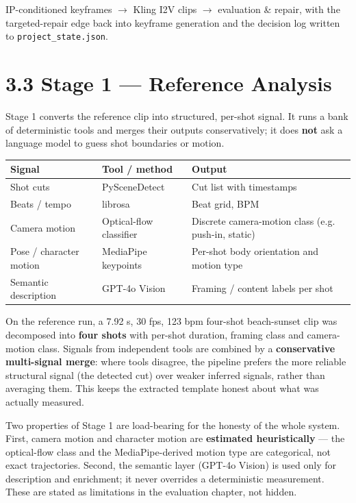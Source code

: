 \documentclass[10pt,twocolumn,letterpaper]{article}
\begin{document}
IP-conditioned keyframes $\rightarrow$ Kling I2V clips $\rightarrow$ evaluation \& repair, with the targeted-repair edge back into keyframe generation and the decision log written to \texttt{project\_state.json}.

\section*{3.3 Stage 1 --- Reference Analysis}

Stage 1 converts the reference clip into structured, per-shot signal. It runs a bank of deterministic tools and merges their outputs conservatively; it does \textbf{not} ask a language model to guess shot boundaries or motion.

\begin{table}[t]
\centering
\footnotesize
\begin{tabularx}{\textwidth}{>{\RaggedRight\arraybackslash}X>{\RaggedRight\arraybackslash}X>{\RaggedRight\arraybackslash}X}
\toprule
Signal & Tool / method & Output \\
\midrule
Shot cuts & PySceneDetect & Cut list with timestamps \\
Beats / tempo & librosa & Beat grid, BPM \\
Camera motion & Optical-flow classifier & Discrete camera-motion class (e.g. push-in, static) \\
Pose / character motion & MediaPipe keypoints & Per-shot body orientation and motion type \\
Semantic description & GPT-4o Vision & Framing / content labels per shot \\
\bottomrule
\end{tabularx}
\end{table}

On the reference run, a 7.92 s, 30 fps, 123 bpm four-shot beach-sunset clip was decomposed into \textbf{four shots} with per-shot duration, framing class and camera-motion class. Signals from independent tools are combined by a \textbf{conservative multi-signal merge}: where tools disagree, the pipeline prefers the more reliable structural signal (the detected cut) over weaker inferred signals, rather than averaging them. This keeps the extracted template honest about what was actually measured.

Two properties of Stage 1 are load-bearing for the honesty of the whole system. First, camera motion and character motion are \textbf{estimated heuristically} --- the optical-flow class and the MediaPipe-derived motion type are categorical, not exact trajectories. Second, the semantic layer (GPT-4o Vision) is used only for description and enrichment; it never overrides a deterministic measurement. These are stated as limitations in the evaluation chapter, not hidden.
\end{document}
